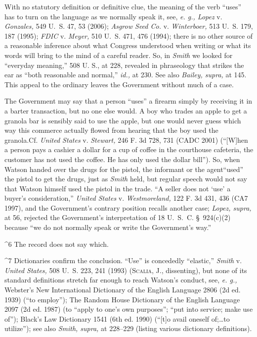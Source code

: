   With no statutory definition or definitive clue, the meaning of the
verb ``uses'' has to turn on the language as we normally speak it,
see, \emph{e. g., Lopez} v. \emph{Gonzales,} 549 U.~S. 47, 53 (2006);
\emph{Asgrow Seed Co.} v. \emph{Winterboer,} 513 U.~S. 179, 187 (1995);
\emph{FDIC} v. \emph{Meyer,} 510 U.~S. 471, 476 (1994); there is no other
source of a reasonable inference about what Congress understood when
writing or what its words will bring to the mind of a careful reader.
So, in \emph{Smith} we looked for ``everyday meaning,'' 508 U. S.,
at 228, revealed in phraseology that strikes the ear as ``both
reasonable and normal,'' \emph{id.,} at 230. See also \emph{Bailey, supra,}
at 145. This appeal to the ordinary leaves the Government without much
of a case.

  The Government may say that a person ``uses'' a firearm simply by
receiving it in a barter transaction, but no one else would. A boy
who trades an apple to get a granola bar is sensibly said to use the
apple, but one would never guess which way this commerce actually flowed
from hearing that the boy used the granola.Cf. \emph{United States} v.
\emph{Stewart,} 246 F. 3d 728, 731 (CADC 2001) (``[W]hen a person pays
a cashier a dollar for a cup of coffee in the courthouse cafeteria,
the customer has not used the coffee. He has only used the dollar
bill''). So, when Watson handed over the drugs for the pistol, the
informant or the agent\footnotemark[6] ``used'' the pistol to get the drugs, just
as \emph{Smith} held, but regular speech would not say that Watson himself
used the pistol in the trade. ``A seller does not ‘use' a buyer's
consideration,'' \emph{United States} v. \emph{Westmoreland,} 122 F. 3d
431, 436 (CA7 1997), and the Government's contrary position recalls
another case; \emph{Lopez, supra,} at 56, rejected the Government's
interpretation of 18 U.~S.~C. \S~924(c)(2) because ``we do not
normally speak or write the Government's way.''\footnotemark[7] \newpage 

^6 The record does not say which.

^7 Dictionaries confirm the conclusion. ``Use'' is concededly
``elastic,'' \emph{Smith} v. \emph{United States,} 508 U.~S. 223,
241 (1993) (\textsc{Scalia,} J., dissenting), but none of its standard
definitions stretch far enough to reach Watson's \newpage  conduct,
see, \emph{e. g.,} Webster's New International Dictionary of the
English Language 2806 (2d ed. 1939) (``to employ''); The Random House
Dictionary of the English Language 2097 (2d ed. 1987) (to ``apply to
one's own purposes''; ``put into service; make use of''); Black's
Law Dictionary 1541 (6th ed. 1990) (``[t]o avail oneself of;\dots to
utilize''); see also \emph{Smith, supra,} at 228--229 (listing various
dictionary definitions).

